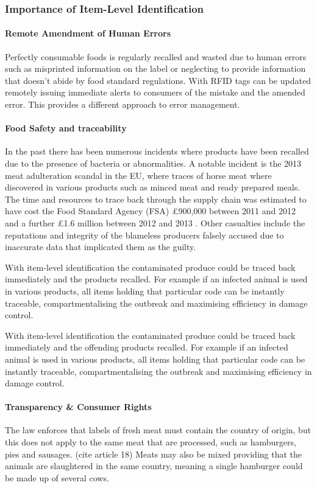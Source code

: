 \documentclass[a4paper, 11pt]{article}
\begin{document}
\subsubsection{Importance of Item-Level Identification}

\paragraph{Remote Amendment of Human Errors}
Perfectly consumable foods is regularly recalled and wasted due to human errors such as misprinted information on the label or neglecting to provide information that doesn't abide by food standard regulations. With RFID tags can be updated remotely issuing immediate alerts to consumers of the mistake and the amended error. This provides a different approach to error management.

\paragraph{Food Safety and traceability}
In the past there has been numerous incidents where products have been recalled due to the presence of bacteria or abnormalities. A notable incident is the 2013 meat adulteration scandal in the EU, where traces of horse meat where discovered in various products such as minced meat and ready prepared meals. The time and resources to trace back through the supply chain was estimated to have cost the Food Standard Agency (FSA) \pounds900,000 between 2011 and 2012 and a further \pounds1.6 million between 2012 and 2013 \cite{3}. Other casualties include the reputations and integrity of the blameless producers falsely accused due to inaccurate data that implicated them as the guilty. 

With item-level identification the contaminated produce could be traced back immediately and the products recalled. For example if an infected animal is used in various products, all items holding that particular code can be instantly traceable, compartmentalising the outbreak and maximising efficiency in damage control. 

With item-level identification the contaminated produce could be traced back immediately and the offending products recalled. For example if an infected animal is used in various products, all items holding that particular code can be instantly traceable, compartmentalising the outbreak and maximising efficiency in damage control. 

\paragraph{Transparency \& Consumer Rights}
The law enforces that labels of fresh meat must contain the country of origin, but this does not apply to the same meat that are processed, such as hamburgers, pies and sausages. (cite article 18) Meats may also be mixed providing that the animals are slaughtered in the same country, meaning a single hamburger could be made up of several cows. 
\end{document}
